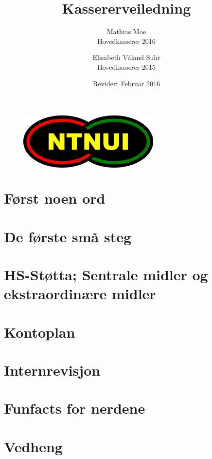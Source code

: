 \documentclass{article}
\title{\huge Kassererveiledning}
\date{Revidert Februar 2016}
\author{Mathias Moe \\ Hovedkasserer 2016
		\and Elisabeth Våland Suhr \\ Hovedkasserer 2015}
\begin{document}
	\begin{figure}
		\centering
		\includegraphics[keepaspectratio=true, width=200pt]{bildr/logo}
	\end{figure}
\maketitle

\tableofcontents
\newpage


\section*{Først noen ord}
    

\section{De første små steg}
    

\newpage
\section{HS-Støtta; Sentrale midler og ekstraordinære midler}
    
    
\newpage
    

\newpage

\section{Kontoplan}
    

\newpage
\section{Internrevisjon}

\newpage
\section*{Funfacts for nerdene}
%	



\newpage
\section{Vedheng}
	
\end{document}
